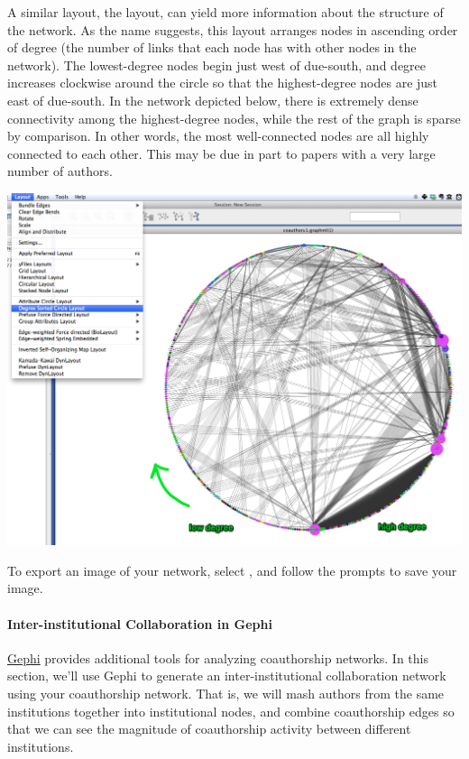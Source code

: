 \documentclass[letterpaper,10pt,english]{sphinxmanual}
\begin{document}
A similar layout, the  layout, can yield more information about
the structure of the network. As the name suggests, this layout arranges nodes in
ascending order of degree (the number of links that each node has with other nodes in the
network). The lowest-degree nodes begin just west of due-south, and degree increases
clockwise around the circle so that the highest-degree nodes are just east of due-south.
In the network depicted below, there is extremely dense connectivity among the
highest-degree nodes, while the rest of the graph is sparse by comparison. In other words,
the most well-connected nodes are all highly connected to each other. This may be due in
part to papers with a very large number of authors.

{\hfill\includegraphics{coauthors.21.png}\hfill}

To export an image of your network, select
, and follow the prompts to save your
image.


\paragraph{Inter-institutional Collaboration in Gephi}
\label{tutorial.coauthors:inter-institutional-collaboration-in-gephi}\label{tutorial.coauthors:coauthors-gephi}
\href{http://www.gephi.org}{Gephi} provides additional tools for analyzing coauthorship
networks. In this section, we'll use Gephi to generate an inter-institutional
collaboration network using your coauthorship network. That is, we will mash authors from
the same institutions together into institutional nodes, and combine coauthorship edges
so that we can see the magnitude of coauthorship activity between different institutions.
\end{document}
